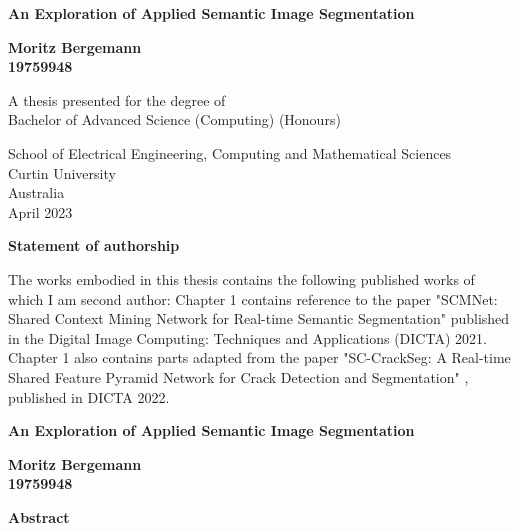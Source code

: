 \documentclass[a4paper,12pt]{report}
\begin{document}
{}
\begin{titlepage}
    \begin{center}
        \vspace*{0.5cm}

        \LARGE
        \textbf{An Exploration of Applied Semantic Image Segmentation}


        \vspace{1.0cm}
        \Large

        \textbf{Moritz Bergemann\\ 19759948}

        \vfill

        A thesis presented for the degree of\\
        Bachelor of Advanced Science (Computing) (Honours)

        \vspace{2.5cm}


        \large
        School of Electrical Engineering, Computing and Mathematical Sciences\\
        Curtin University\\
        Australia\\
        April 2023

    \end{center}
\end{titlepage}

\thispagestyle{plain}
\begin{center}
    \Large
    \textbf{Statement of authorship}
\end{center}
The works embodied in this thesis contains the following published works of which I am second author: Chapter 1 contains reference to the paper "SCMNet: Shared Context Mining Network for Real-time Semantic Segmentation" \cite{singha_scmnet_2021} published in the Digital Image Computing: Techniques and Applications (DICTA) 2021. Chapter 1 also contains parts adapted from the paper "SC-CrackSeg: A Real-time Shared Feature Pyramid Network for Crack Detection and Segmentation" \cite{singha_sc-crackseg_2022}, published in DICTA 2022.
\newpage

\thispagestyle{plain}
\begin{center}
    \Large
    \textbf{An Exploration of Applied Semantic Image Segmentation}

    \vspace{0.4cm}
    \large

    \vspace{0.4cm}
    \textbf{Moritz Bergemann\\ 19759948}

    \vspace{0.9cm}
    \textbf{Abstract}
\end{center}
\end{document}
